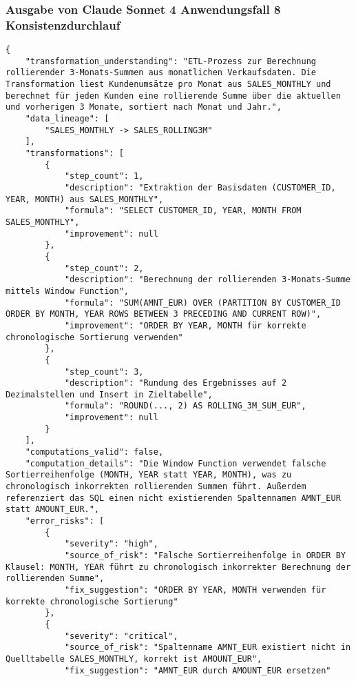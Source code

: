 \subsubsection{Ausgabe von Claude Sonnet 4 Anwendungsfall 8 Konsistenzdurchlauf}\label{anhang:subsubsec:claude_case8_prompt2}
\begin{lstlisting}[caption={Ausgabe: Claude Sonnet 4 Anwendungsfall 8 Konsistenzdurchlauf},label={claude_case8_prompt2}]
{
    "transformation_understanding": "ETL-Prozess zur Berechnung rollierender 3-Monats-Summen aus monatlichen Verkaufsdaten. Die Transformation liest Kundenumsätze pro Monat aus SALES_MONTHLY und berechnet für jeden Kunden eine rollierende Summe über die aktuellen und vorherigen 3 Monate, sortiert nach Monat und Jahr.",
    "data_lineage": [
        "SALES_MONTHLY -> SALES_ROLLING3M"
    ],
    "transformations": [
        {
            "step_count": 1,
            "description": "Extraktion der Basisdaten (CUSTOMER_ID, YEAR, MONTH) aus SALES_MONTHLY",
            "formula": "SELECT CUSTOMER_ID, YEAR, MONTH FROM SALES_MONTHLY",
            "improvement": null
        },
        {
            "step_count": 2,
            "description": "Berechnung der rollierenden 3-Monats-Summe mittels Window Function",
            "formula": "SUM(AMNT_EUR) OVER (PARTITION BY CUSTOMER_ID ORDER BY MONTH, YEAR ROWS BETWEEN 3 PRECEDING AND CURRENT ROW)",
            "improvement": "ORDER BY YEAR, MONTH für korrekte chronologische Sortierung verwenden"
        },
        {
            "step_count": 3,
            "description": "Rundung des Ergebnisses auf 2 Dezimalstellen und Insert in Zieltabelle",
            "formula": "ROUND(..., 2) AS ROLLING_3M_SUM_EUR",
            "improvement": null
        }
    ],
    "computations_valid": false,
    "computation_details": "Die Window Function verwendet falsche Sortierreihenfolge (MONTH, YEAR statt YEAR, MONTH), was zu chronologisch inkorrekten rollierenden Summen führt. Außerdem referenziert das SQL einen nicht existierenden Spaltennamen AMNT_EUR statt AMOUNT_EUR.",
    "error_risks": [
        {
            "severity": "high",
            "source_of_risk": "Falsche Sortierreihenfolge in ORDER BY Klausel: MONTH, YEAR führt zu chronologisch inkorrekter Berechnung der rollierenden Summe",
            "fix_suggestion": "ORDER BY YEAR, MONTH verwenden für korrekte chronologische Sortierung"
        },
        {
            "severity": "critical",
            "source_of_risk": "Spaltenname AMNT_EUR existiert nicht in Quelltabelle SALES_MONTHLY, korrekt ist AMOUNT_EUR",
            "fix_suggestion": "AMNT_EUR durch AMOUNT_EUR ersetzen"

\end{lstlisting}
